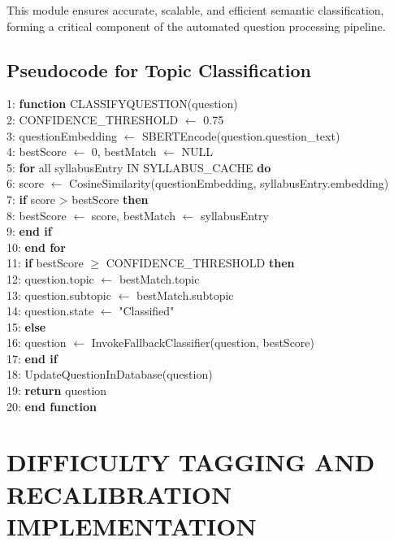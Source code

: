 \begin{sloppypar}
This module ensures accurate, scalable, and efficient semantic classification, forming a critical component of the automated question processing pipeline.

\subsection{Pseudocode for Topic Classification}

1: \textbf{function} CLASSIFYQUESTION(question)\\
2: \quad CONFIDENCE\_THRESHOLD $\leftarrow$ 0.75\\
3: \quad questionEmbedding $\leftarrow$ SBERTEncode(question.question\_text)\\
4: \quad bestScore $\leftarrow$ 0, bestMatch $\leftarrow$ NULL\\
5: \quad \textbf{for} all syllabusEntry IN SYLLABUS\_CACHE \textbf{do}\\
6: \qquad score $\leftarrow$ CosineSimilarity(questionEmbedding, syllabusEntry.embedding)\\
7: \qquad \textbf{if} score > bestScore \textbf{then}\\
8: \qquad\quad bestScore $\leftarrow$ score, bestMatch $\leftarrow$ syllabusEntry\\
9: \qquad \textbf{end if}\\
10: \quad \textbf{\textbf{end for}}\\
11: \quad \textbf{if} bestScore $\geq$ CONFIDENCE\_THRESHOLD \textbf{then}\\
12: \qquad question.topic $\leftarrow$ bestMatch.topic\\
13: \qquad question.subtopic $\leftarrow$ bestMatch.subtopic\\
14: \qquad question.state $\leftarrow$ "Classified"\\
15: \quad \textbf{else}\\
16: \qquad question $\leftarrow$ InvokeFallbackClassifier(question, bestScore)\\
17: \quad \textbf{end if}\\
18: \quad UpdateQuestionInDatabase(question)\\
19: \quad \textbf{return} question\\
20: \textbf{end function}
\algofooter

\section{\MakeUppercase{DIFFICULTY TAGGING AND RECALIBRATION IMPLEMENTATION}}


\end{sloppypar}
